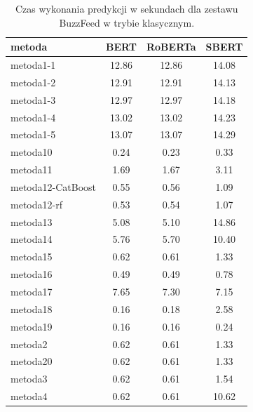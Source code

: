 \begin{table}[H]
	\centering
	\caption{Czas wykonania predykcji w sekundach dla zestawu BuzzFeed w trybie klasycznym.}
	\label{tab:execution_time_buzzfeed_classic}
	\small
	\begin{tabular}{lccc}
		\toprule
		\textbf{metoda}   & \textbf{BERT} & \textbf{RoBERTa} & \textbf{SBERT} \\
		\midrule
		metoda1-1         & 12.86         & 12.86            & 14.08          \\
		metoda1-2         & 12.91         & 12.91            & 14.13          \\
		metoda1-3         & 12.97         & 12.97            & 14.18          \\
		metoda1-4         & 13.02         & 13.02            & 14.23          \\
		metoda1-5         & 13.07         & 13.07            & 14.29          \\
		metoda10          & 0.24          & 0.23             & 0.33           \\
		metoda11          & 1.69          & 1.67             & 3.11           \\
		metoda12-CatBoost & 0.55          & 0.56             & 1.09           \\
		metoda12-rf       & 0.53          & 0.54             & 1.07           \\
		metoda13          & 5.08          & 5.10             & 14.86          \\
		metoda14          & 5.76          & 5.70             & 10.40          \\
		metoda15          & 0.62          & 0.61             & 1.33           \\
		metoda16          & 0.49          & 0.49             & 0.78           \\
		metoda17          & 7.65          & 7.30             & 7.15           \\
		metoda18          & 0.16          & 0.18             & 2.58           \\
		metoda19          & 0.16          & 0.16             & 0.24           \\
		metoda2           & 0.62          & 0.61             & 1.33           \\
		metoda20          & 0.62          & 0.61             & 1.33           \\
		metoda3           & 0.62          & 0.61             & 1.54           \\
		metoda4           & 0.62          & 0.61             & 10.62          \\

\end{tabular}
\end{table}
